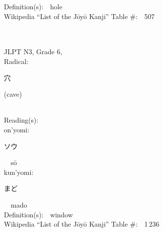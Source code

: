 \begin{multicols}{2}
Definition(s):\ \ hole \\
Wikipedia ``List of the J\=oy\=o Kanji'' Table \#:\ \ 507 \\
\ \ \\
{\fontsize{34pt}{40pt}  }\ \ \\  %
{JLPT N3, Grade 6, \\Radical:\ \ {\begin{CJK}{UTF8}{min} 穴 \end{CJK}} (cave) } \\
Reading(s):\ \ \\
{\hspace*{1em}}on'yomi:\ \ \\
{\hspace*{2em}}{\begin{CJK}{UTF8}{min} ソウ \end{CJK}}\ \ s\=o\ \ \\
{\hspace*{1em}}kun'yomi:\ \ \\
{\hspace*{2em}}{\begin{CJK}{UTF8}{min} まど \end{CJK}}\ \ mado\ \ \\
Definition(s):\ \ window \\
Wikipedia ``List of the J\=oy\=o Kanji'' Table \#:\ \ 1\,236 \\
\ \ \\
\end{multicols}



